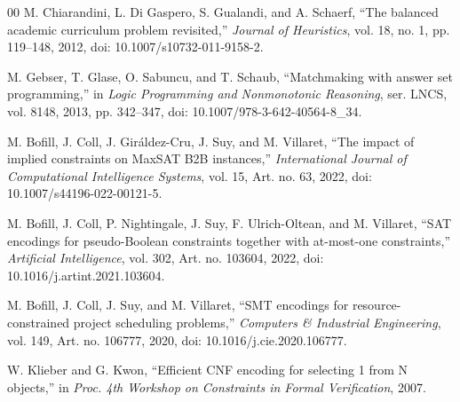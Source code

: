 \documentclass[conference,a4paper]{IEEEtran}
\begin{document}
\begin{thebibliography}{00}
M. Chiarandini, L. Di Gaspero, S. Gualandi, and A. Schaerf,
``The balanced academic curriculum problem revisited,''
\emph{Journal of Heuristics}, vol. 18, no. 1, pp. 119--148, 2012,
doi: 10.1007/s10732-011-9158-2.

M. Gebser, T. Glase, O. Sabuncu, and T. Schaub,
``Matchmaking with answer set programming,'' in \emph{Logic Programming and
Nonmonotonic Reasoning}, ser. LNCS, vol. 8148, 2013, pp. 342--347,
doi: 10.1007/978-3-642-40564-8\_34.

M. Bofill, J. Coll, J. Gir\'{a}ldez-Cru, J. Suy, and M. Villaret,
``The impact of implied constraints on MaxSAT B2B instances,''
\emph{International Journal of Computational Intelligence Systems}, vol. 15,
Art. no. 63, 2022, doi: 10.1007/s44196-022-00121-5.

M. Bofill, J. Coll, P. Nightingale, J. Suy, F. Ulrich-Oltean, and M. Villaret,
``SAT encodings for pseudo-Boolean constraints together with at-most-one
constraints,'' \emph{Artificial Intelligence}, vol. 302, Art. no. 103604,
2022, doi: 10.1016/j.artint.2021.103604.

M. Bofill, J. Coll, J. Suy, and M. Villaret,
``SMT encodings for resource-constrained project scheduling problems,''
\emph{Computers \& Industrial Engineering}, vol. 149, Art. no. 106777, 2020,
doi: 10.1016/j.cie.2020.106777.

W. Klieber and G. Kwon,
``Efficient CNF encoding for selecting 1 from N objects,''
in \emph{Proc. 4th Workshop on Constraints in Formal Verification}, 2007.

\end{thebibliography}
\end{document}
